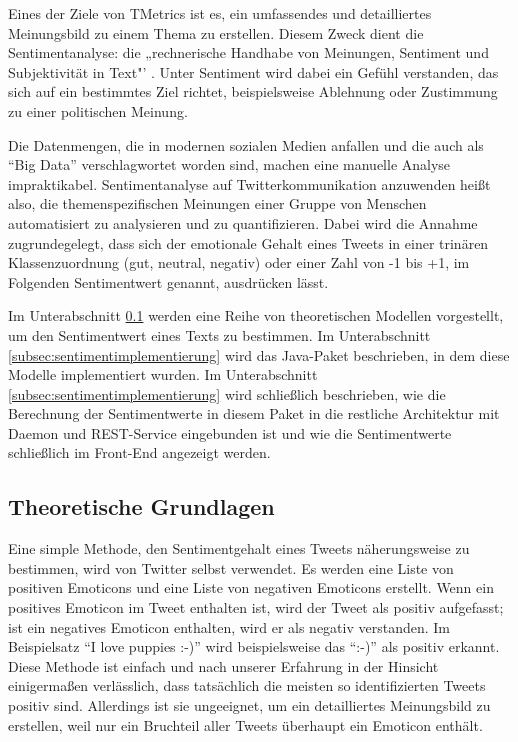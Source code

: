 \label{sec:Sentiment}

Eines der Ziele von TMetrics ist es, ein umfassendes und detailliertes Meinungsbild zu einem Thema zu erstellen. Diesem Zweck dient die Sentimentanalyse: die „rechnerische Handhabe von Meinungen, Sentiment und Subjektivität in Text"' \cite{Pang2008}. Unter Sentiment wird dabei ein Gefühl verstanden, das sich auf ein bestimmtes Ziel richtet, beispielsweise Ablehnung oder Zustimmung zu einer politischen Meinung.

Die Datenmengen, die in modernen sozialen Medien anfallen und die auch als "`Big Data"' verschlagwortet worden sind, machen eine manuelle Analyse impraktikabel. Sentimentanalyse auf Twitterkommunikation anzuwenden heißt also, die themenspezifischen Meinungen einer Gruppe von Menschen automatisiert zu analysieren und zu quantifizieren. Dabei wird die Annahme zugrundegelegt, dass sich der emotionale Gehalt eines Tweets in einer trinären Klassenzuordnung (gut, neutral, negativ) oder einer Zahl von -1 bis +1, im Folgenden Sentimentwert genannt, ausdrücken lässt.

Im Unterabschnitt \ref{subsec:sentimenttheorie} werden eine Reihe von theoretischen Modellen vorgestellt, um den Sentimentwert eines Texts zu bestimmen. Im Unterabschnitt \ref{subsec:sentimentimplementierung} wird das Java-Paket beschrieben, in dem diese Modelle implementiert wurden. Im Unterabschnitt \ref{subsec:sentimentimplementierung} wird schließlich beschrieben, wie die Berechnung der Sentimentwerte in diesem Paket in die restliche Architektur mit Daemon und REST-Service eingebunden ist und wie die Sentimentwerte schließlich im Front-End angezeigt werden.

\subsection{Theoretische Grundlagen}
\label{subsec:sentimenttheorie}

Eine simple Methode, den Sentimentgehalt eines Tweets näherungsweise zu bestimmen, wird von Twitter selbst verwendet. Es werden eine Liste von positiven Emoticons und eine Liste von negativen Emoticons erstellt. Wenn ein positives Emoticon im Tweet enthalten ist, wird der Tweet als positiv aufgefasst; ist ein negatives Emoticon enthalten, wird er als negativ verstanden. Im Beispielsatz "`I love puppies :-)"' wird beispielsweise das "`:-)"' als positiv erkannt. Diese Methode ist einfach und nach unserer Erfahrung in der Hinsicht einigermaßen verlässlich, dass tatsächlich die meisten so identifizierten Tweets positiv sind. Allerdings ist sie ungeeignet, um ein detailliertes Meinungsbild zu erstellen, weil nur ein Bruchteil aller Tweets überhaupt ein Emoticon enthält.

